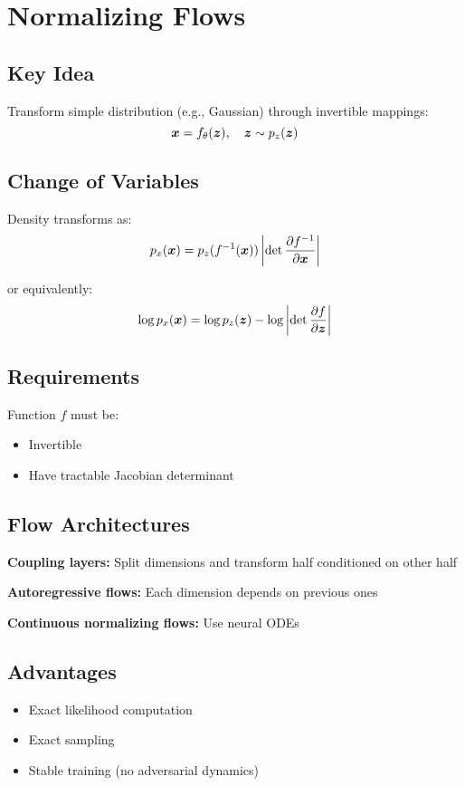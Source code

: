
\section{Normalizing Flows}
\label{sec:normalizing-flows}

\subsection{Key Idea}

Transform simple distribution (e.g., Gaussian) through invertible mappings:
\begin{equation}
\boldsymbol{x} = f_{\theta}(\boldsymbol{z}), \quad \boldsymbol{z} \sim p_z(\boldsymbol{z})
\end{equation}

\subsection{Change of Variables}

Density transforms as:
\begin{equation}
p_x(\boldsymbol{x}) = p_z(f^{-1}(\boldsymbol{x})) \left|\det \frac{\partial f^{-1}}{\partial \boldsymbol{x}}\right|
\end{equation}

or equivalently:
\begin{equation}
\log p_x(\boldsymbol{x}) = \log p_z(\boldsymbol{z}) - \log\left|\det \frac{\partial f}{\partial \boldsymbol{z}}\right|
\end{equation}

\subsection{Requirements}

Function $f$ must be:
\begin{itemize}
    \item Invertible
    \item Have tractable Jacobian determinant
\end{itemize}

\subsection{Flow Architectures}

\textbf{Coupling layers:} Split dimensions and transform half conditioned on other half

\textbf{Autoregressive flows:} Each dimension depends on previous ones

\textbf{Continuous normalizing flows:} Use neural ODEs

\subsection{Advantages}

\begin{itemize}
    \item Exact likelihood computation
    \item Exact sampling
    \item Stable training (no adversarial dynamics)
\end{itemize}

